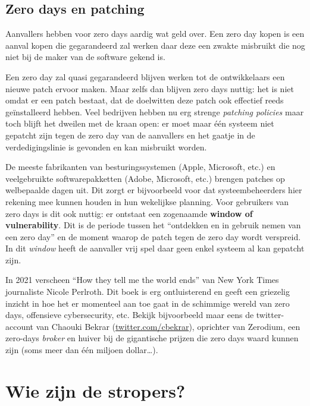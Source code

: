 \documentclass[
  10pt,
  dutch,
  paper=a4,
  ,captions=tableheading
]{scrbook}
\begin{document}
\subsection{Zero days en patching}\label{zero-days-en-patching}

Aanvallers hebben voor zero days aardig wat geld over. Een zero day
kopen is een aanval kopen die gegarandeerd zal werken daar deze een
zwakte misbruikt die nog niet bij de maker van de software gekend is.

Een zero day zal quasi gegarandeerd blijven werken tot de ontwikkelaars
een nieuwe patch ervoor maken. Maar zelfs dan blijven zero days nuttig:
het is niet omdat er een patch bestaat, dat de doelwitten deze patch ook
effectief reeds geïnstalleerd hebben. Veel bedrijven hebben nu erg
strenge \emph{patching policies} maar toch blijft het dweilen met de
kraan open: er moet maar één systeem niet gepatcht zijn tegen de zero
day van de aanvallers en het gaatje in de verdedigingslinie is gevonden
en kan misbruikt worden.

De meeste fabrikanten van besturingssystemen (Apple, Microsoft, etc.) en
veelgebruikte softwarepakketten (Adobe, Microsoft, etc.) brengen patches
op welbepaalde dagen uit. Dit zorgt er bijvoorbeeld voor dat
systeembeheerders hier rekening mee kunnen houden in hun wekelijkse
planning. Voor gebruikers van zero days is dit ook nuttig: er ontstaat
een zogenaamde \textbf{window of vulnerability}. Dit is de periode
tussen het ``ontdekken en in gebruik nemen van een zero day'' en de
moment waarop de patch tegen de zero day wordt verspreid. In dit
\emph{window} heeft de aanvaller vrij spel daar geen enkel systeem al
kan gepatcht zijn.

\begin{tipblock}
In 2021 verscheen ``How they tell me the world ends'' van New York Times
journaliste Nicole Perlroth. Dit boek is erg ontluisterend en geeft een
griezelig inzicht in hoe het er momenteel aan toe gaat in de schimmige
wereld van zero days, offensieve cybersecurity, etc. Bekijk bijvoorbeeld
maar eens de twitter-account van Chaouki Bekrar
(\href{https://twitter.com/cbekrar}{twitter.com/cbekrar}), oprichter van
Zerodium, een zero-days \emph{broker} en huiver bij de gigantische
prijzen die zero days waard kunnen zijn (soms meer dan één miljoen
dollar\ldots).
\end{tipblock}

\section{Wie zijn de stropers?}\label{wie-zijn-de-stropers}
\end{document}
